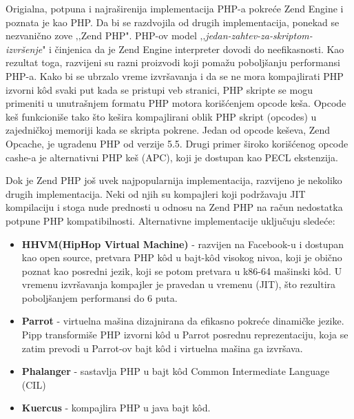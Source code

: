 \documentclass[a4paper]{article}
\begin{document}
{Origialna, potpuna i najraširenija implementacija PHP-a pokreće Zend Engine i poznata je kao PHP. Da bi se razdvojila od drugih implementacija, ponekad se nezvanično zove ‚‚Zend PHP". PHP-ov model ‚‚\textit{jedan-zahtev-za-skriptom-izvršenje}" i činjenica da je Zend Engine interpreter dovodi do neefikasnosti. Kao rezultat toga, razvijeni su razni proizvodi koji pomažu poboljšanju performansi PHP-a. Kako bi se ubrzalo vreme izvršavanja i da se ne mora kompajlirati PHP izvorni k\^{o}d svaki put kada se pristupi veb stranici, PHP skripte se mogu primeniti u unutrašnjem formatu PHP motora korišćenjem opcode keša. Opcode keš funkcioniše tako što kešira kompajlirani oblik PHP skript (opcodes) u zajedničkoj memoriji kada se skripta pokrene. Jedan od opcode keševa, Zend Opcache\cite{zend}, je ugradenu PHP od verzije 5.5. Drugi primer široko korišćenog opcode cashe-a je alternativni PHP keš (APC)\cite{php}, koji je dostupan kao PECL ekstenzija.

Dok je Zend PHP još uvek najpopularnija implementacija, razvijeno je nekoliko drugih implementacija. Neki od njih su kompajleri koji podržavaju JIT\cite{jit} kompilaciju i stoga nude prednosti u odnosu na Zend PHP na račun nedostatka potpune PHP kompatibilnosti. Alternativne implementacije uključuju sledeće:
\begin{itemize}
\item \textbf{HHVM(HipHop Virtual Machine)}\cite{hhvm} - razvijen na Facebook-u i dostupan kao open source, pretvara PHP k\^{o}d  u bajt-k\^{o}d visokog nivoa, koji je obično poznat kao posredni jezik, koji se potom pretvara u k86-64 mašinski k\^{o}d. U vremenu izvršavanja kompajler je pravedan u vremenu (JIT), što rezultira poboljšanjem performansi do 6 puta.
\item \textbf{Parrot}\cite{parrot} - virtuelna mašina dizajnirana da efikasno pokreće dinamičke jezike. Pipp transformiše PHP izvorni k\^{o}d u Parrot posrednu reprezentaciju, koja se zatim prevodi u Parrot-ov bajt k\^{o}d i virtuelna mašina ga izvršava.
\item \textbf{Phalanger} - sastavlja PHP u bajt k\^{o}d Common Intermediate Language (CIL)
\item \textbf{Kuercus} - kompajlira PHP u java bajt k\^{o}d.
\end{itemize}


}
\end{document}
